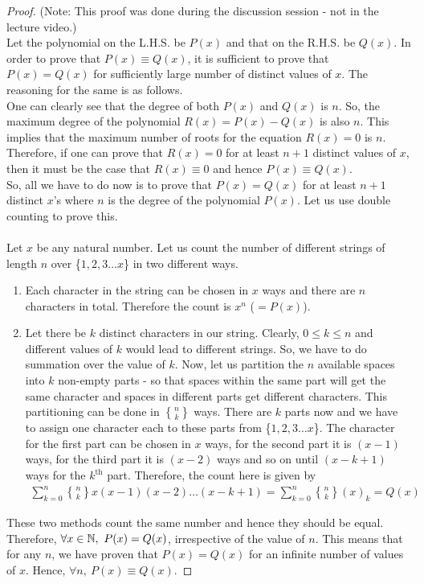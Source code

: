     \begin{proof} (Note: This proof was done during the discussion session - not in the lecture video.)\\
    Let the polynomial on the L.H.S. be $P(x)$ and that on the R.H.S. be $Q(x)$. In order to prove that $P(x) \equiv Q(x)$, it is sufficient to prove that $P(x) = Q(x)$ for sufficiently large number of distinct values of $x$. The reasoning for the same is as follows.\\
    One can clearly see that the degree of both $P(x)$ and $Q(x)$ is $n$. So, the maximum degree of the polynomial $R(x) = P(x) - Q(x)$ is also $n$. This implies that the maximum number of roots for the equation $R(x)=0$ is $n$. Therefore, if one can prove that $R(x)=0$ for at least $n+1$ distinct values of $x$, then it must be the case that $R(x) \equiv 0$ and hence $P(x) \equiv Q(x)$.\\
    So, all we have to do now is to prove that $P(x) = Q(x)$ for at least $n+1$ distinct $x$'s where $n$ is the degree of the polynomial $P(x)$. Let us use double counting to prove this.\\
    \noindent\\
    Let $x$ be any natural number. Let us count the number of different strings of length $n$ over \{$1,2,3\ldots x$\} in two different ways. 
    \begin{enumerate}
        \item Each character in the string can be chosen in $x$ ways and there are $n$ characters in total. Therefore the count is $x^n$ ($=P(x)$).  
        \item Let there be $k$ distinct characters in our string. Clearly, $0 \leq k \leq n$ and different values of $k$ would lead to different strings. So, we have to do summation over the value of $k$. Now, let us partition the $n$ available spaces into $k$ non-empty parts - so that spaces within the same part will get the same character and spaces in different parts get different characters. This partitioning can be done in ${n \brace k}$ ways. There are $k$ parts now and we have to assign one character each to these parts from \{$1,2,3\ldots x$\}. The character for the first part can be chosen in $x$ ways, for the second part it is $(x-1)$ ways, for the third part it is $(x-2)$ ways and so on until $(x-k+1)$ ways for the $k^{\text{th}}$ part. Therefore, the count here is given by
        \begin{align*}
            \sum_{k=0}^{n}{n \brace k} x(x-1)(x-2)\ldots(x-k+1) = \sum_{k=0}^{n}{n \brace k} (x)_k = Q(x)
        \end{align*}
    \end{enumerate}
    These two methods count the same number and hence they should be equal. Therefore, $\forall x \in \mathbb{N}, ~ P(x)=Q(x)$, irrespective of the value of $n$. This means that for any $n$, we have proven that $P(x)=Q(x)$ for an infinite number of values of $x$. Hence, $\forall n,~P(x)\equiv Q(x)$.
    \end{proof}
